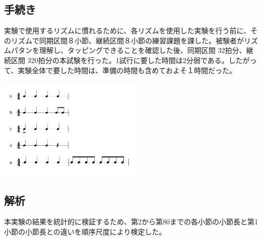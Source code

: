 \documentclass[twocolumn,10pt]{jarticle}
\begin{document}
\subsection{手続き}
実験で使用するリズムに慣れるために、各リズムを使用した実験を行う前に、そのリズムで同期区間８小節、継続区間８小節の練習課題を課した。被験者がリズムパタンを理解し、タッピングできることを確認した後、同期区間 32拍分、継続区間 320拍分の本試験を行った。1試行に要した時間は2分弱である。したがって、実験全体で要した時間は、準備の時間も含めておよそ１時間だった。
\begin{center}
	\includegraphics[width=7cm]{Rhythm_Pattern.jpg}
\end{center}	

\subsection{解析}
本実験の結果を統計的に検証するため、第2から第80までの各小節の小節長と第1小節の小節長との違いを順序尺度により検定した。



\end{document}
